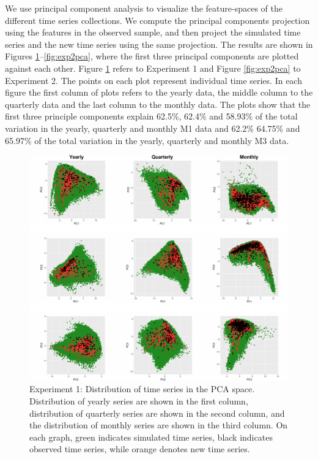 \documentclass[11pt,a4paper,]{article}
\theoremstyle{definition}
\theoremstyle{definition}
\theoremstyle{definition}
\theoremstyle{remark}
\begin{document}
We use principal component analysis to visualize the feature-spaces of
the different time series collections. We compute the principal
components projection using the features in the observed sample, and
then project the simulated time series and the new time series using the
same projection. The results are shown in Figures
\ref{fig:exp1pca}--\ref{fig:exp2pca}, where the first three principal
components are plotted against each other. Figure \ref{fig:exp1pca}
refers to Experiment 1 and Figure \ref{fig:exp2pca} to Experiment 2. The
points on each plot represent individual time series. In each figure the
first column of plots refers to the yearly data, the middle column to
the quarterly data and the last column to the monthly data. The plots
show that the first three principle components explain 62.5\%, 62.4\%
and 58.93\% of the total variation in the yearly, quarterly and monthly
M1 data and 62.2\% 64.75\% and 65.97\% of the total variation in the
yearly, quarterly and monthly M3 data.

\begin{figure}

{\centering \includegraphics[width=\textwidth]{figure/exp1pca-1} 

}

\caption{Experiment 1: Distribution of time series in the PCA space. Distribution of yearly series are shown in the first column, distribution of quarterly series are shown in the second column, and the distribution of monthly series are shown in the third column. On each graph, green indicates simulated time series, black indicates observed time series, while orange denotes new time series.}\label{fig:exp1pca}
\end{figure}
\end{document}
